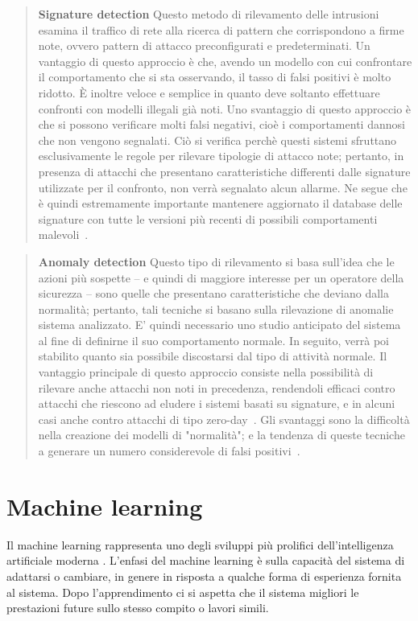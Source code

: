 \documentclass[../main.tex]{subfiles}
\begin{document}
\begin{verse}
				\textbf{Signature detection} Questo metodo di rilevamento delle intrusioni esamina il traffico di rete alla ricerca di pattern che corrispondono a firme note, ovvero pattern di attacco preconfigurati e predeterminati. Un vantaggio di questo approccio è che, avendo un modello con cui confrontare il comportamento che si sta osservando, il tasso di falsi positivi è molto ridotto. È inoltre veloce e semplice in quanto deve soltanto effettuare confronti con modelli illegali già noti.
				Uno svantaggio di questo approccio è che si possono verificare molti falsi negativi, cioè i comportamenti dannosi che non vengono segnalati. Ciò si verifica perchè questi sistemi sfruttano esclusivamente le regole per rilevare tipologie di attacco note; pertanto, in presenza di attacchi che presentano caratteristiche differenti dalle signature utilizzate per il confronto, non verrà segnalato alcun allarme. Ne segue che è quindi estremamente importante mantenere aggiornato il database delle signature con tutte le versioni più recenti di possibili comportamenti malevoli~\cite{snort}.
\end{verse}

\begin{verse}
				\textbf{Anomaly detection} Questo tipo di rilevamento si basa sull'idea che le azioni più sospette -- e quindi di maggiore interesse per un operatore della sicurezza -- sono quelle che presentano caratteristiche che deviano dalla normalità; pertanto, tali tecniche si basano sulla rilevazione di anomalie sistema analizzato. E' quindi necessario uno studio anticipato del sistema al fine di definirne il suo comportamento normale. In seguito, verrà poi stabilito quanto sia possibile discostarsi dal tipo di attività normale. 
				Il vantaggio principale di questo approccio consiste nella possibilità di rilevare anche attacchi non noti in precedenza, rendendoli efficaci contro attacchi che riescono ad eludere i sistemi basati su signature, e in alcuni casi anche contro attacchi di tipo zero-day~\cite{zerodaydef}.
				Gli svantaggi sono la difficoltà nella creazione dei modelli di "normalità"; e la tendenza di queste tecniche a generare un numero considerevole di falsi positivi~\cite{suricatadef}.
\end{verse}

\section{Machine learning}
Il machine learning rappresenta uno degli sviluppi più prolifici dell'intelligenza artificiale moderna \cite{compIntelligence}. L'enfasi del machine learning è sulla capacità del sistema di adattarsi o cambiare, in genere in risposta a qualche forma di esperienza fornita al sistema. Dopo l'apprendimento ci si aspetta che il sistema migliori le prestazioni future sullo stesso compito o lavori simili.
\end{document}
